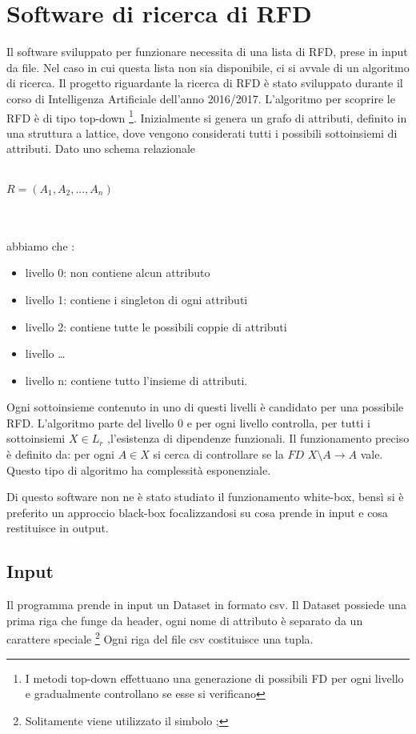 \section{Software di ricerca di RFD}
Il software sviluppato per funzionare necessita di una lista di RFD, prese in input da file. Nel caso in cui questa lista non sia disponibile, ci si avvale di un algoritmo di ricerca.
Il progetto riguardante la ricerca di RFD è stato sviluppato durante il corso di Intelligenza Artificiale dell’anno 2016/2017.
L’algoritmo per scoprire le RFD è di tipo top-down \footnote{I metodi top-down effettuano una generazione di possibili FD per ogni livello e gradualmente controllano se esse si verificano}.
Inizialmente si genera un grafo di attributi, definito in una struttura a lattice, dove vengono considerati tutti i possibili sottoinsiemi di attributi. Dato uno schema relazionale
\\~\\ 
\centerline{$R=(A_1,A_2,...,A_n)$}
\\~\\
abbiamo che :
\begin{itemize}[noitemsep]
\item livello 0: non contiene alcun attributo
\item livello 1: contiene i singleton di ogni attributi
\item livello 2: contiene tutte le possibili coppie di attributi
\item livello \ldots
\item livello n: contiene tutto l’insieme di attributi.
\end{itemize}
Ogni sottoinsieme contenuto in uno di questi livelli è candidato per una possibile RFD.
L’algoritmo parte del livello 0  e per ogni livello controlla, per tutti i sottoinsiemi $X \in L_r$ ,l’esistenza di dipendenze funzionali.
Il funzionamento preciso è definito da:
per ogni $A \in X$ si cerca di controllare se la $FD$  $X\setminus A \xrightarrow{}  A $ vale. Questo tipo di algoritmo ha complessità esponenziale.

Di questo software non ne è stato studiato il funzionamento white-box, bensì si è preferito un approccio black-box focalizzandosi su cosa prende in input e cosa restituisce in output.

\subsection{Input}
Il programma prende in input un Dataset in formato csv.
Il Dataset possiede una prima riga che funge da header, ogni nome di attributo è separato da un carattere speciale \footnote{Solitamente viene utilizzato il simbolo  ;  }
Ogni riga del file csv costituisce una tupla.

